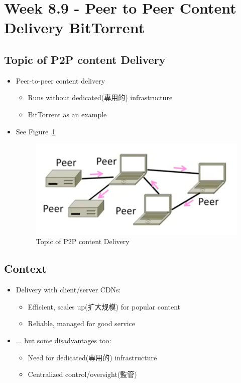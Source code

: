 \documentclass[12pt]{ctexart}   %
\begin{document}
\section{Week 8.9 - Peer to Peer Content Delivery BitTorrent}
	\subsection{Topic of P2P content Delivery}
	\begin{itemize}
		\item Peer-to-peer content delivery
		\begin{itemize}
			\item Runs without dedicated(專用的) infrastructure
			\item BitTorrent as an example
		\end{itemize}
		\item See Figure~\ref{fig:8-9-1}
		  
		 \begin{figure}[h!] %
		\centering
		 \includegraphics[scale=0.7]{images/8-9-1}
		\caption{ Topic of P2P content Delivery }
		 \label{fig:8-9-1}
		 \end{figure}
	\end{itemize}
	
	\subsection{Context}
	\begin{itemize}
		\item Delivery with client/server CDNs:
		\begin{itemize}
			\item Efficient, scales up(扩大规模) for popular content
			\item Reliable, managed for good service
		\end{itemize}
		
		\item ... but some disadvantages too:
		\begin{itemize}
			\item Need for dedicated(專用的) infrastructure
			\item Centralized control/oversight(監管)
		\end{itemize}
	\end{itemize}
	
\end{document}
